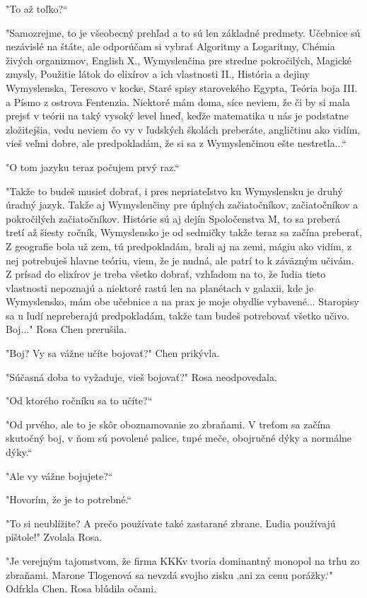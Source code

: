 \documentclass{book}
\begin{document}
"$ $To až toľko?“

"$ $Samozrejme, to je všeobecný prehľad a to sú len základné predmety. Učebnice sú nezávislé na štáte, ale odporúčam si vybrať Algoritmy a Logaritmy, Chémia živých organizmov, English X., Wymyslenčina pre stredne pokročilých, Magické zmysly, Použitie látok do elixírov a ich vlastnosti II., História a dejiny Wymyslenska, Teresovo v kocke, Staré spisy starovekého Egypta, Teória boja III. a Písmo z ostrova Fentenzia. Niektoré mám doma, síce neviem, že či by si mala prejsť v teórii na taký vysoký level hneď, keďže matematika u nás je podstatne zložitejšia, vedu neviem čo vy v ľudských školách preberáte, angličtinu ako vidím, vieš veľmi dobre, ale predpokladám, že si sa z Wymyslenčinou ešte nestretla...“

"$ $O tom jazyku teraz počujem prvý raz.“

"$ $Takže to budeš musieť dobrať, i pres nepriateľstvo ku Wymyslensku je druhý úradný jazyk. Takže aj Wymyslenčiny pre úplných začiatočníkov, začiatočníkov a pokročilých začiatočníkov. Histórie sú aj dejín Spoločenstva M, to sa preberá tretí až šiesty ročník, Wymyslensko je od sedmičky takže teraz sa začína preberať, Z geografie bola už zem, tú predpokladám, brali aj na zemi, mágiu ako vidím, z nej potrebuješ hlavne teóriu, viem, že je nudná, ale patrí to k záväzným učivám. Z prísad do elixírov je treba všetko dobrať, vzhľadom na to, že ľudia tieto vlastnosti nepoznajú a niektoré rastú len na planétach v galaxii, kde je Wymyslensko, mám obe učebnice a na prax je moje obydlie vybavené... Staropisy sa u ľudí nepreberajú predpokladám, takže tam budeš potrebovať všetko učivo. Boj..."$ $ Rosa Chen prerušila.

"$ $Boj? Vy sa vážne učíte bojovať?"$ $ Chen prikývla.

"$ $Súčasná doba to vyžaduje, vieš bojovať?"$ $ Rosa neodpovedala.

"$ $Od ktorého ročníku sa to učíte?“

"$ $Od prvého, ale to je skôr oboznamovanie zo zbraňami. V treťom sa začína skutočný boj, v ňom sú povolené palice, tupé meče, obojručné dýky a normálne dýky.“

"$ $Ale vy vážne bojujete?“

"$ $Hovorím, že je to potrebné.“

"$ $To si neublížite? A prečo používate také zastarané zbrane. Ľudia používajú pištole!"$ $ Zvolala Rosa.

"$ $Je verejným tajomstvom, že firma KKKv tvoria dominantný monopol na trhu zo zbraňami. Marone Tlogenová sa nevzdá svojho zisku ,ani za cenu porážky.‘"$ $ Odfrkla Chen. Rosa blúdila očami.
\end{document}
